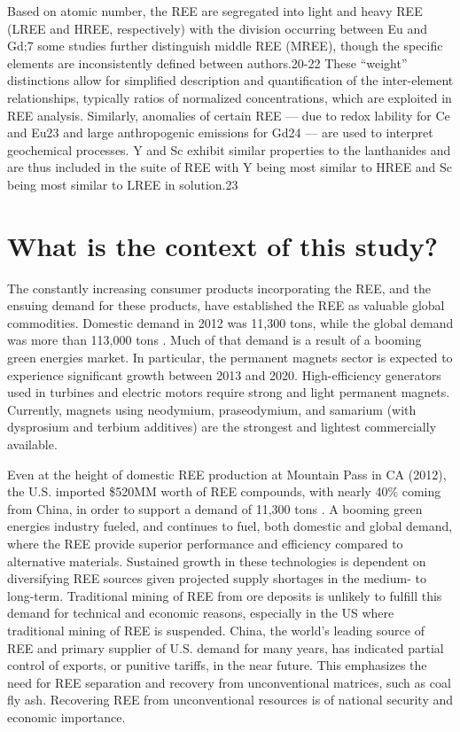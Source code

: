 Based on atomic number, the REE are segregated into light and heavy REE (LREE and HREE, respectively) with the division occurring between Eu and Gd;7
some studies further distinguish middle REE (MREE), though the specific elements are inconsistently defined between authors.20-22
These ``weight'' distinctions allow for simplified description and quantification of the inter-element relationships, typically ratios of normalized concentrations, which are exploited in REE analysis.
Similarly, anomalies of certain REE --- due to redox lability for Ce and Eu23 and large anthropogenic emissions for Gd24 --- are used to interpret geochemical processes.
Y and Sc exhibit similar properties to the lanthanides and are thus included in the suite of REE with Y being most similar to HREE and Sc being most similar to LREE in solution.23 

\section{What is the context of this study?}

The constantly increasing consumer products incorporating the REE, and the ensuing demand for these products, have established the REE as valuable global commodities.
Domestic demand in 2012 was 11,300 tons, while the global demand was more than 113,000 tons \citep{FrostSullivan_REEmarket}.
Much of that demand is a result of a booming green energies market.
In particular, the permanent magnets sector is expected to experience significant growth between 2013 and 2020.
High-efficiency generators used in turbines and electric motors require strong and light permanent magnets.
Currently, magnets using neodymium, praseodymium, and samarium (with dysprosium and terbium additives) are the strongest and lightest commercially available.


Even at the height of domestic REE production at Mountain Pass in CA (2012), the U.S. imported \$520MM worth of REE compounds, with nearly 40\% coming from China, in order to support a demand of 11,300 tons \citep{USGS_minyb_2012}.
A booming green energies industry fueled, and continues to fuel, both domestic and global demand, where the REE provide superior performance and efficiency compared to alternative materials.
Sustained growth in these technologies is dependent on diversifying REE sources given projected supply shortages in the medium- to long-term.
Traditional mining of REE from ore deposits is unlikely to fulfill this demand for technical and economic reasons, especially in the US where traditional mining of REE is suspended.
China, the world's leading source of REE and primary supplier of U.S. demand for many years, has indicated partial control of exports, or punitive tariffs, in the near future.
This emphasizes the need for REE separation and recovery from unconventional matrices, such as coal fly ash.
Recovering REE from unconventional resources is of national security and economic importance.

